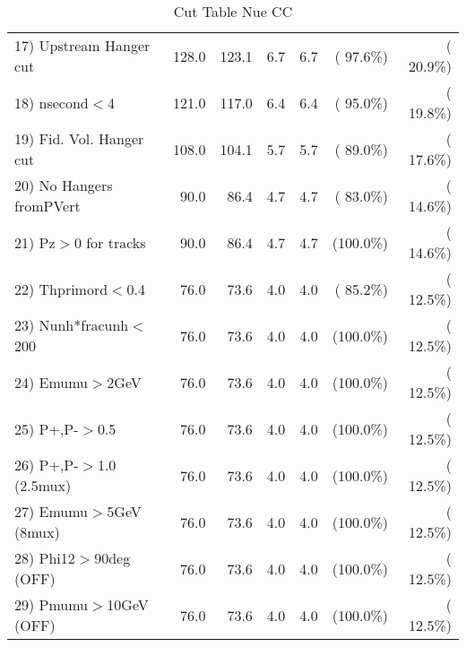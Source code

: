 \begin{table}[h!]
\begin{tabular}{||l||r|r|r|r|r|r||}
 17) Upstream Hanger cut  &        128.0 &        123.1 &          6.7 &          6.7 & ( 97.6\%) & ( 20.9\%) \\
 18) nsecond$<$4          &        121.0 &        117.0 &          6.4 &          6.4 & ( 95.0\%) & ( 19.8\%) \\
 19) Fid. Vol. Hanger cut &        108.0 &        104.1 &          5.7 &          5.7 & ( 89.0\%) & ( 17.6\%) \\
 20) No Hangers fromPVert &         90.0 &         86.4 &          4.7 &          4.7 & ( 83.0\%) & ( 14.6\%) \\
 21) Pz$>$0 for tracks    &         90.0 &         86.4 &          4.7 &          4.7 & (100.0\%) & ( 14.6\%) \\
 22) Thprimord$<$0.4      &         76.0 &         73.6 &          4.0 &          4.0 & ( 85.2\%) & ( 12.5\%) \\
 23) Nunh*fracunh$<$200   &         76.0 &         73.6 &          4.0 &          4.0 & (100.0\%) & ( 12.5\%) \\
 24) Emumu$>$2GeV         &         76.0 &         73.6 &          4.0 &          4.0 & (100.0\%) & ( 12.5\%) \\
 25) P+,P-$>$0.5          &         76.0 &         73.6 &          4.0 &          4.0 & (100.0\%) & ( 12.5\%) \\
 26) P+,P-$>$1.0 (2.5mux) &         76.0 &         73.6 &          4.0 &          4.0 & (100.0\%) & ( 12.5\%) \\
 27) Emumu$>$5GeV  (8mux) &         76.0 &         73.6 &          4.0 &          4.0 & (100.0\%) & ( 12.5\%) \\
 28) Phi12$>$90deg  (OFF) &         76.0 &         73.6 &          4.0 &          4.0 & (100.0\%) & ( 12.5\%) \\
 29) Pmumu$>$10GeV  (OFF) &         76.0 &         73.6 &          4.0 &          4.0 & (100.0\%) & ( 12.5\%) \\
 \hline
 \hline
 \end{tabular}
 \caption{Cut Table   Nue CC  }
 \label{tab-cutcohjpsi-mumu_nuecc}
 \end{table}
